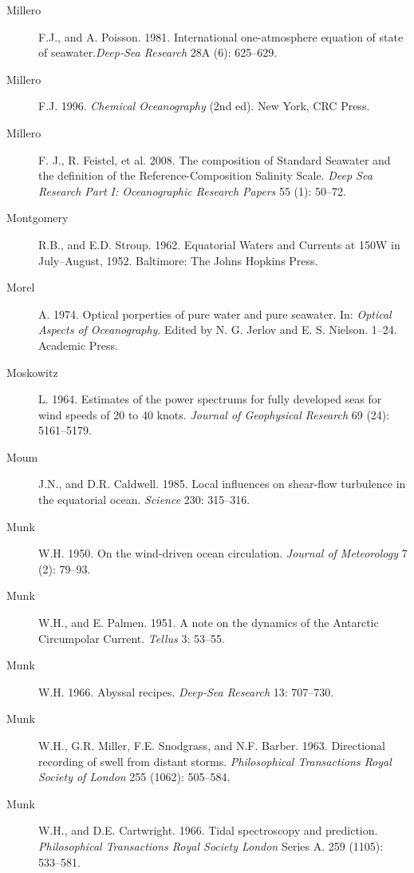 \begin{description}
\item [Millero]F.J., and A. Poisson. 1981. International one-atmosphere
equation of state of seawater.\textit{Deep-Sea Research} 28A (6): 625--629.

\item [Millero]F.J. 1996. \textit{Chemical Oceanography} (2nd ed). New York, CRC
Press.

\item [Millero]F. J., R. Feistel, et al. 2008. The composition of Standard Seawater and the definition of the Reference-Composition Salinity Scale. \textit{Deep Sea Research Part I: Oceanographic Research Papers} 55 (1): 50--72.

\item [Montgomery]R.B., and E.D. Stroup. 1962. Equatorial Waters and Currents at
150\degrees W in July--August, 1952. Baltimore: The Johns Hopkins Press.

\item [Morel]A. 1974. Optical porperties of pure water and pure seawater. In:
\textit{Optical Aspects of Ocean\-ography}. Edited by N. G. Jerlov and E. S.
Nielson.  1--24. Academic Press.
	
\item [Moskowitz]L. 1964. Estimates of the power spectrums for fully developed
seas for wind speeds of 20 to 40 knots. \textit{Journal of Geophysical Research} 69 (24):
5161--5179.

\item [Moum]J.N., and D.R. Caldwell. 1985. Local influences on shear-flow
turbulence in the equatorial ocean. \textit{Science} 230: 315--316.

\item [Munk]W.H. 1950. On the wind-driven ocean circulation. \textit{Journal of Meteorology} 7 (2): 79--93.

\item [Munk]W.H., and E. Palmen. 1951. A note on the dynamics of the Antarctic
Circumpolar Current. \textit{Tellus} 3: 53--55.

\item [Munk]W.H. 1966. Abyssal recipes. \textit{Deep-Sea Research} 13: 707--730.

\item [Munk]W.H., G.R. Miller, F.E. Snodgrass, and N.F. Barber. 1963.
Directional recording of swell from distant storms. \textit{Philosophical
Transactions Royal Society of London} 255 (1062): 505--584.

\item [Munk]W.H., and D.E. Cartwright. 1966. Tidal spectroscopy and prediction.
\textit{Philosophical Transactions Royal Society London} Series A. 259 (1105):
533--581.


\end{description}
